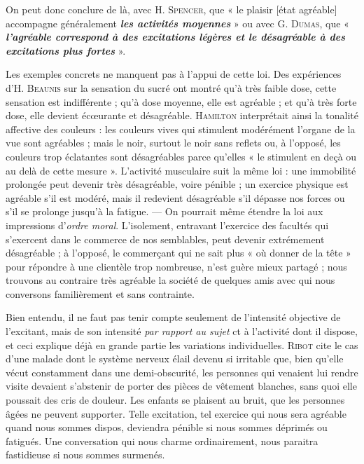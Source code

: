 On peut donc conclure de là, avec H. \textsc{Spencer}, que « le plaisir [état
agréable] accompagne généralement \textbf{\textit {les activités moyennes}} » ou avec
G. \textsc{Dumas}, que « \textbf{\textit {l'agréable correspond à des excitations légères
et le désagréable à des excitations plus fortes}} ».

{\footnotesize
Les exemples concrets ne manquent pas à l'appui de cette loi. Des expériences
d'H. \textsc{Beaunis} sur la sensation du sucré ont montré qu’à très faible
dose, cette sensation est indifférente ; qu’à dose moyenne, elle est agréable ;
et qu’à très forte dose, elle devient écœurante et désagréable. \textsc{Hamilton}
interprétait ainsi la tonalité affective des couleurs : les couleurs vives qui
stimulent modérément l'organe de la vue sont agréables ; mais le noir, surtout
le noir sans reflets ou, à l'opposé, les couleurs trop éclatantes sont
désagréables parce qu’elles « le stimulent en deçà ou au delà de cette mesure ».
L'activité musculaire suit la même loi : une immobilité prolongée peut
devenir très désagréable, voire pénible ; un exercice physique est agréable
s’il est modéré, mais il redevient désagréable s’il dépasse nos forces ou s’il
se prolonge jusqu’à la fatigue. — On pourrait même étendre la loi aux
impressions d'{\it ordre moral}. L'isolement, entravant l'exercice des facultés
qui s’exercent dans le commerce de nos semblables, peut devenir extrémement
désagréable ; à l’opposé, le commerçant qui ne sait plus « où donner
de la tête » pour répondre à une clientèle trop nombreuse, n'est guère mieux
partagé ; nous trouvons au contraire très agréable la société de quelques
amis avec qui nous conversons familièrement et sans contrainte.
}

Bien entendu, il ne faut pas tenir compte seulement de l'intensité
objective de l’excitant, mais de son intensité {\it par rapport au sujet} ct
à l’activité dont il dispose, et ceci explique déjà en grande partie les
variations individuelles. \textsc{Ribot} cite le cas d’une malade dont le
système nerveux élail devenu si irritable que, bien qu’elle vécut
constamment dans une demi-obscurité, les personnes qui venaient
lui rendre visite devaient s'abstenir de porter des pièces de vêtement
blanches, sans quoi elle poussait des cris de douleur. Les enfants se
plaisent au bruit, que les personnes âgées ne peuvent supporter.
Telle excitation, tel exercice qui nous sera agréable quand nous
sommes dispos, deviendra pénible si nous sommes déprimés ou fatigués.
Une conversation qui nous charme ordinairement, nous paraitra fastidieuse
si nous sommes surmenés.

